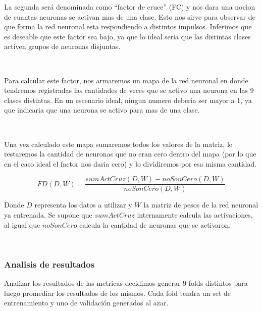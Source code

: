 \documentclass[informe.tex]{subfiles}
\begin{document}
      La segunda ser\'a denominada como ``factor de cruce'' (FC) y nos dara una nocion de cuantas neuronas se activan mas de una clase. Esto nos sirve para observar de que forma la red neuronal esta respondiendo a distintos impulsos. Inferimos que es deseable que este factor sea bajo, ya que lo ideal seria que las distintas clases activen grupos de neuronas disjuntas.
      
      ~
      
      Para calcular este factor, nos armaremos un mapa de la red neuronal en donde tendremos registradas las cantidades de veces que se activo una neurona en las 9 clases distintas. En un escenario ideal, ningun numero deberia ser mayor a 1, ya que indicaria que una neurona se activo para mas de una clase.
      
      ~
      
      Una vez calculado este mapa sumaremos todos los valores de la matriz, le restaremos la cantidad de neuronas que no eran cero dentro del mapa (por lo que en el caso ideal el factor nos daria cero) y lo dividiremos por esa misma cantidad.
      
      $$FD(D, W) = \frac{sumActCruz(D, W) - noSonCero(D, W)}{noSonCero(D, W)}$$
      
      Donde $D$ representa los datos a utilizar y $W$ la matriz de pesos de la red neuronal ya entrenada. Se supone que $sumActCruz$ internamente calcula las activaciones, al igual que $noSonCero$ calcula la cantidad de neuronas que se activaron.
      
      ~
      \subsubsection{Analisis de resultados}
      Analizar los resultados de las metricas decidimos generar 9 folds distintos para luego promediar los resultados de los mismos. Cada fold tendra un set de entrenamiento y uno de validación generados al azar.
    
      
      
\end{document}
